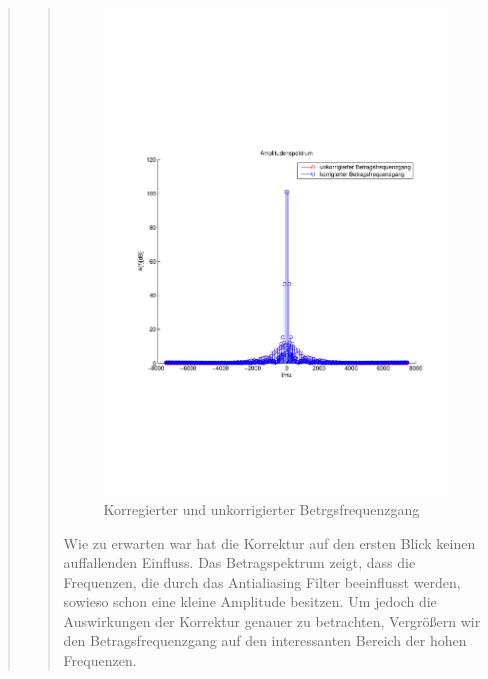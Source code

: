 \begin{quote}
\begin{quote}
        \begin{figure}[H]
        \centering
            \includegraphics[scale=0.7, trim = 1.5cm 7cm 1.5cm 8.5cm, clip]{./Bilder/betragsfrequenzgang_korr_vs_unkorr.pdf}
                \caption{Korregierter und unkorrigierter Betrgsfrequenzgang}
        \end{figure}
        
        Wie zu erwarten war hat die Korrektur auf den ersten Blick keinen auffallenden Einfluss. Das Betragspektrum
        zeigt, dass die Frequenzen, die durch das Antialiasing Filter
        beeinflusst werden, sowieso schon eine kleine Amplitude besitzen. Um jedoch die Auswirkungen der Korrektur 
        genauer zu betrachten, Vergrößern wir den Betragsfrequenzgang auf den interessanten Bereich der hohen Frequenzen.
        

\end{quote}
\end{quote}
